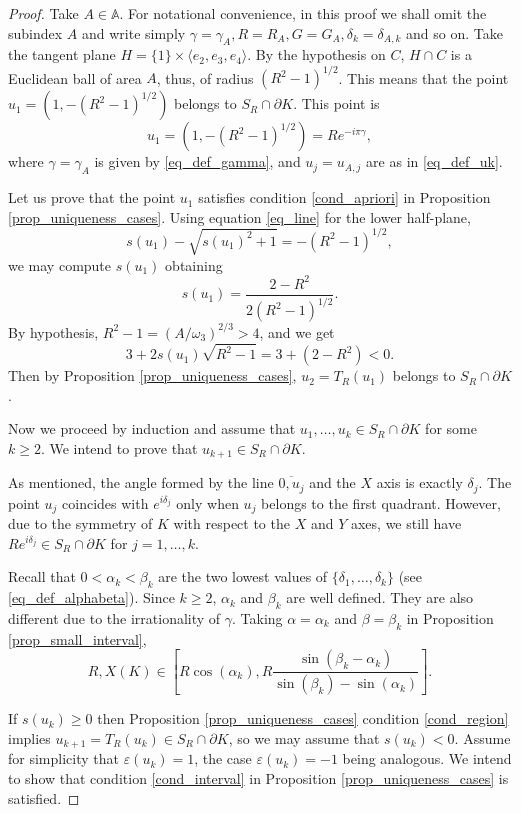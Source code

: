 \documentclass{amsart}
\def \B{\mathbb B}
\def \e{\varepsilon}
\begin{document}
\begin{proof}
	Take $A \in \mathbb A$.
	For notational convenience, in this proof we shall omit the subindex $A$ and write simply $\gamma = \gamma_A, R = R_A, G = G_A, \delta_k = \delta_{A,k}$ and so on.
	Take the tangent plane $H = \{1\} \times \langle e_2, e_3, e_4 \rangle $. By the hypothesis on $C$, $H \cap C$ is a Euclidean ball of area $A$, thus, of radius $(R^2-1)^{1/2}$.
	This means that the point $u_1 = (1, - (R^2-1)^{1/2})$ belongs to $S_R \cap \partial K$.
	This point is
	\[u_1 = (1,-(R^2-1)^{1/2}) = R e^{-i \pi \gamma},\]
	where $\gamma = \gamma_A$ is given by \eqref{eq_def_gamma}, and $u_j = u_{A,j}$ are as in \eqref{eq_def_uk}.

	Let us prove that the point $u_1$ satisfies condition \eqref{cond_apriori} in Proposition \ref{prop_uniqueness_cases}.
	Using equation \eqref{eq_line} for the lower half-plane,
	\[s(u_1) -\sqrt{s(u_1)^2+1} = -(R^2 -1)^{1/2},\]
	we may compute $s(u_1)$ obtaining
	\[s(u_1) = \frac{2-R^2}{2(R^2-1)^{1/2}}.\]
	By hypothesis, $R^2-1 = (A/\omega_3)^{2/3} > 4$, and we get
	\[3+2s(u_1) \sqrt{R^2-1} = 3 + (2-R^2) < 0.\]
	Then by Proposition \ref{prop_uniqueness_cases}, $u_2 = T_R(u_1)$ belongs to $S_R \cap \partial K$.

	Now we proceed by induction and assume that $u_1, \ldots, u_k \in S_R \cap \partial K$ for some $k \geq 2$.
	We intend to prove that $u_{k+1} \in S_R \cap \partial K$.

	As mentioned, the angle formed by the line $\overline{ 0, u_j }$ and the $X$ axis is exactly $\delta_j$.
	The point $u_j$ coincides with $e^{i \delta_j}$ only when $u_j$ belongs to the first quadrant. However, due to the symmetry of $K$ with respect to the $X$ and $Y$ axes, we still have $R e^{i \delta_j} \in S_R \cap \partial K$ for $j=1, \ldots, k$.

	Recall that $0< \alpha_k < \beta_k$ are the two lowest values of $\{\delta_1, \ldots, \delta_k\}$ (see \eqref{eq_def_alphabeta}).
	Since $k \geq 2$, $\alpha_k$ and $\beta_k$ are well defined. They are also different due to the irrationality of $\gamma$.
	Taking $\alpha = \alpha_k$ and $\beta = \beta_k$ in Proposition \ref{prop_small_interval}, 
	\begin{equation}
		\label{eq_Rl_interval}
		R,X(K) \in [R \cos(\alpha_k), R\frac {\sin(\beta_k-\alpha_k)}{\sin(\beta_k) - \sin(\alpha_k)}] .
	\end{equation}

	If $s(u_k) \geq 0$ then Proposition \ref{prop_uniqueness_cases} condition \eqref{cond_region} implies $u_{k+1} = T_R(u_k) \in S_R \cap \partial K$, so we may assume that $s(u_k) < 0$.
	Assume for simplicity that $\e(u_k) = 1$, the case $\e(u_k) = -1$ being analogous.
	We intend to show that condition \eqref{cond_interval} in Proposition \ref{prop_uniqueness_cases} is satisfied.


\end{proof}
\end{document}

